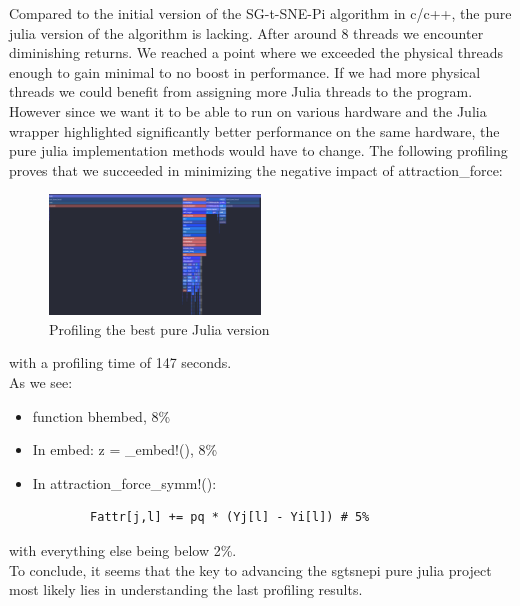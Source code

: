 Compared to the initial version of the SG-t-SNE-Pi algorithm in c/c++, the pure julia version of the algorithm 
is lacking. After around 8 threads we encounter diminishing returns. We reached a point where we exceeded 
the physical threads enough to gain minimal to no boost in performance. If we had more physical threads 
we could benefit from assigning more Julia threads to the program. However since we want it to be able to 
run on various hardware and the Julia wrapper highlighted significantly better performance on the same 
hardware, the pure julia implementation methods would have to change. The following profiling proves that 
we succeeded in minimizing the negative impact of attraction\_force:
\begin{figure}[H]
    \includegraphics[width=0.5\textwidth]{media/bhembedProfiling.png}
    \caption{Profiling the best pure Julia version}
\end{figure}
with a profiling time of 147 seconds. \\

As we see:
\begin{itemize}
    \item function bhembed, 8\%
    \item In embed: z = \_embed!(), 8\%
    \item In attraction\_force\_symm!(): 
    \begin{verbatim}
        Fattr[j,l] += pq * (Yj[l] - Yi[l]) # 5%
    \end{verbatim}
\end{itemize}
with everything else being below 2\%. \\

To conclude, it seems that the key to advancing the sgtsnepi pure julia project most likely lies in 
understanding the last profiling results.